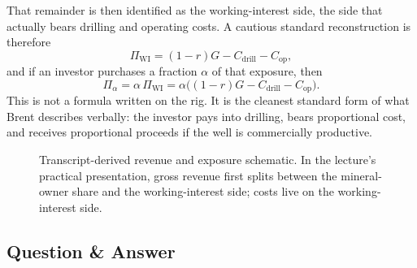 That remainder is then identified as the working-interest side, the side that actually bears drilling and operating costs. A cautious standard reconstruction is therefore
\begin{equation}
\Pi_{\mathrm{WI}} = (1-r)G - C_{\mathrm{drill}} - C_{\mathrm{op}},
\end{equation}
and if an investor purchases a fraction \(\alpha\) of that exposure, then
\begin{equation}
\Pi_{\alpha} = \alpha\,\Pi_{\mathrm{WI}} = \alpha\big((1-r)G - C_{\mathrm{drill}} - C_{\mathrm{op}}\big).
\end{equation}
This is not a formula written on the rig. It is the cleanest standard form of what Brent describes verbally: the investor pays into drilling, bears proportional cost, and receives proportional proceeds if the well is commercially productive.

\begin{figure}[h]
\centering
{}
\caption{Transcript-derived revenue and exposure schematic. In the lecture's practical presentation, gross revenue first splits between the mineral-owner share and the working-interest side; costs live on the working-interest side.}
\end{figure}

\subsection{Question \& Answer}

